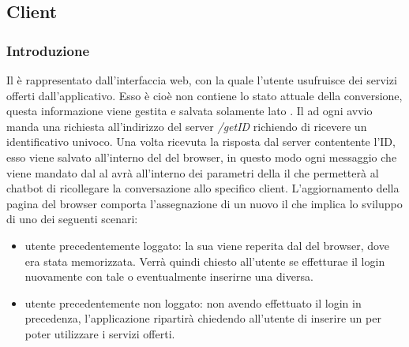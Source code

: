 \subsection{Client}
\subsubsection{Introduzione}
Il  è rappresentato dall'interfaccia web, con la quale l'utente usufruisce dei servizi offerti dall'applicativo. Esso è  cioè non contiene lo stato attuale della conversione, questa informazione viene gestita e salvata solamente lato . \newline
Il  ad ogni avvio manda una richiesta  all'indirizzo del server \textit{/getID} richiendo di ricevere un identificativo univoco. Una volta ricevuta la risposta dal server contentente l'ID, esso viene salvato all'interno del  del browser, in questo modo ogni messaggio che viene mandato dal  al  avrà all'interno dei parametri della  il  che permetterà al chatbot di ricollegare la conversazione allo specifico client. \newline
L'aggiornamento della pagina del browser comporta l'assegnazione di un nuovo  il che implica lo sviluppo di uno dei seguenti scenari:
\begin{itemize}
    \item utente precedentemente loggato: la sua  viene reperita dal  del browser, dove era stata memorizzata. Verrà quindi chiesto all'utente se effetturae il login nuovamente con tale  o eventualmente inserirne una diversa.
    \item utente precedentemente non loggato: non avendo effettuato il login in precedenza, l'applicazione ripartirà chiedendo all'utente di inserire un  per poter utilizzare i servizi offerti. 
\end{itemize}


